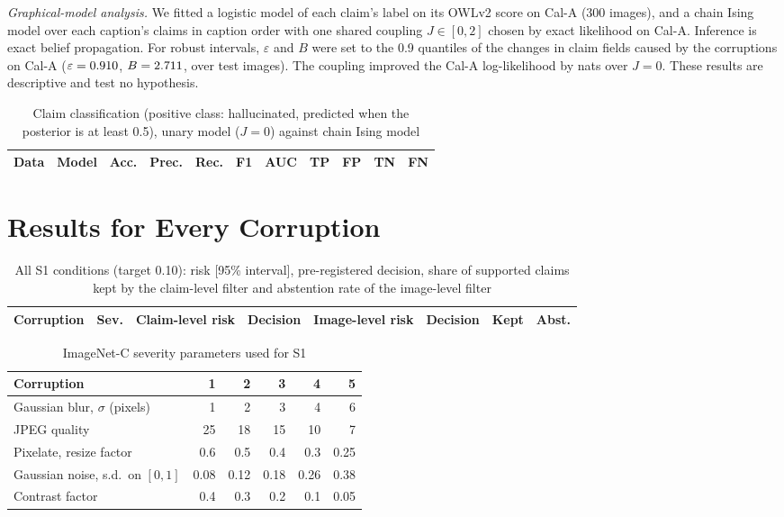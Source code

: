 \documentclass[journal,onecolumn,11pt]{IEEEtran}
\begin{document}
\emph{Graphical-model analysis.} We fitted a logistic model of each claim's label on its OWLv2 score on Cal-A (300 images), and a chain Ising model over each caption's claims in caption order with one shared coupling $J\in[0,2]$ chosen by exact likelihood on Cal-A. Inference is exact belief propagation. For robust intervals, $\varepsilon$ and $B$ were set to the 0.9 quantiles of the changes in claim fields caused by the corruptions on Cal-A ($\varepsilon=0.910$, $B=2.711$, over \RobImgs{} test images). The coupling improved the Cal-A log-likelihood by \LLgain{} nats over $J=0$. These results are descriptive and test no hypothesis.

\begin{table}[h]\centering\small
\caption{Claim classification (positive class: hallucinated, predicted when the posterior is at least 0.5), unary model ($J=0$) against chain Ising model}
\begin{tabular}{@{}llrrrrrrrrr@{}}\toprule
Data & Model & Acc. & Prec. & Rec. & F1 & AUC & TP & FP & TN & FN\\\midrule
\end{tabular}
\end{table}

\section{Results for Every Corruption}
\begin{table}[h]\centering\small
\caption{All S1 conditions (target 0.10): risk [95\% interval], pre-registered decision, share of supported claims kept by the claim-level filter and abstention rate of the image-level filter}
\begin{tabular}{@{}llllllll@{}}\toprule
Corruption & Sev. & Claim-level risk & Decision & Image-level risk & Decision & Kept & Abst.\\\midrule
\end{tabular}
\end{table}

\begin{table}[h]\centering\small
\caption{ImageNet-C severity parameters used for S1}
\begin{tabular}{@{}lrrrrr@{}}\toprule
Corruption & 1 & 2 & 3 & 4 & 5\\\midrule
Gaussian blur, $\sigma$ (pixels) & 1 & 2 & 3 & 4 & 6\\
JPEG quality & 25 & 18 & 15 & 10 & 7\\
Pixelate, resize factor & 0.6 & 0.5 & 0.4 & 0.3 & 0.25\\
Gaussian noise, s.d.\ on $[0,1]$ & 0.08 & 0.12 & 0.18 & 0.26 & 0.38\\
Contrast factor & 0.4 & 0.3 & 0.2 & 0.1 & 0.05\\\bottomrule
\end{tabular}
\end{table}
\end{document}
